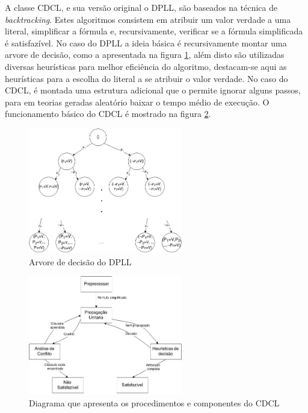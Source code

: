 \documentclass{ufsc-thesis}
\begin{document}
A classe CDCL, e sua versão original o DPLL, são baseados na técnica 
de \textit{backtracking}\cite{Davis1962}. Estes algoritmos consistem em  atribuir um 
valor verdade a uma literal, simplificar a fórmula e, recursivamente, 
verificar se a fórmula simplificada é satisfazível. No caso do DPLL a ideia 
básica é recursivamente montar uma arvore de decisão, como a apresentada na 
figura \ref{fig:DPLL}, além disto são utilizadas diversas heurísticas para melhor eficiência do algoritmo, 
destacam-se aqui as heurísticas para a escolha do literal a se atribuir o 
valor verdade\cite{Ouyang1996}. No caso do CDCL, é montada uma estrutura adicional 
que o permite ignorar alguns passos, para em teorias geradas aleatório 
baixar o tempo médio de execução\cite{Silva1997}. O funcionamento básico do 
CDCL é mostrado na figura \ref{fig:CDCL}.

\begin{figure}[H]
    \centering
    \includegraphics[width=0.6\textwidth]{figuras/DPLL.jpg}
    \caption{Arvore de decisão do DPLL}
    \label{fig:DPLL}
\end{figure}

\begin{figure}[H]
    \centering
    \includegraphics[width=0.6\textwidth]{figuras/CDCL.jpg}
    \caption{Diagrama que apresenta os procedimentos e componentes do CDCL}
    \label{fig:CDCL}
\end{figure}
\end{document}
